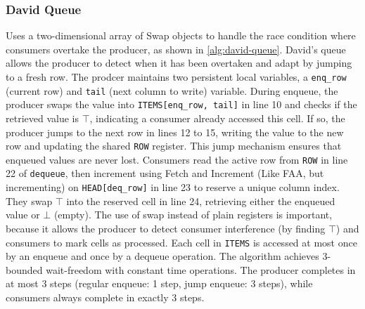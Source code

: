 \subsubsection{David Queue}\label{subsubsec:david-queue}
Uses a two-dimensional array of Swap objects to handle the race condition where consumers overtake the producer, as shown in \cref{alg:david-queue}. David's queue allows the producer to detect when it has been overtaken and adapt by jumping to a fresh row. The prodcer maintains two persistent local variables, a \texttt{enq\_row} (current row) and \texttt{tail} (next column to write) variable. During enqueue, the producer swaps the value into \texttt{ITEMS[enq\_row, tail]} in line 10 and checks if the retrieved value is $\top$, indicating a consumer already accessed this cell. If so, the producer jumps to the next row in lines 12 to 15, writing the value to the new row and updating the shared \texttt{ROW} register. This jump mechanism ensures that enqueued values are never lost. Consumers read the active row from \texttt{ROW} in line 22 of \texttt{dequeue}, then increment using Fetch and Increment (Like \ac{FAA}, but incrementing) on \texttt{HEAD[deq\_row]} in line 23 to reserve a unique column index. They swap $\top$ into the reserved cell in line 24, retrieving either the enqueued value or $\bot$ (empty). The use of swap instead of plain registers is important, because it allows the producer to detect consumer interference (by finding $\top$) and consumers to mark cells as processed. Each cell in \texttt{ITEMS} is accessed at most once by an enqueue and once by a dequeue operation. The algorithm achieves 3-bounded wait-freedom with constant time operations. The producer completes in at most 3 steps (regular enqueue: 1 step, jump enqueue: 3 steps), while consumers always complete in exactly 3 steps. \cite{Mateíspmc}

